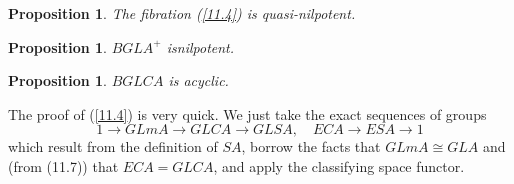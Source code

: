 \documentclass[openany,leqno]{book}  %
\newtheorem{prop}[theorem]{Proposition}
\begin{document}
\begin{prop}\label{11.5}
 	The fibration (\ref{11.4}) is quasi-nilpotent.
 \end{prop} 

\begin{prop}\label{11.6}
 	$BGLA^+$ isnilpotent.
 \end{prop} 

\begin{prop}
 	$BGLCA$ is acyclic.
 \end{prop} 
The proof of (\ref{11.4}) is very quick. We just take the exact sequences of groups
\[1\longrightarrow GLmA \longrightarrow GLCA \longrightarrow GLSA, \quad ECA\longrightarrow ESA\longrightarrow 1\]
which result from the definition of $SA$, borrow the facts that $GLmA \cong GLA$ and (from (11.7))
that $ECA=GLCA$, and apply the classifying space functor.
\end{document}
